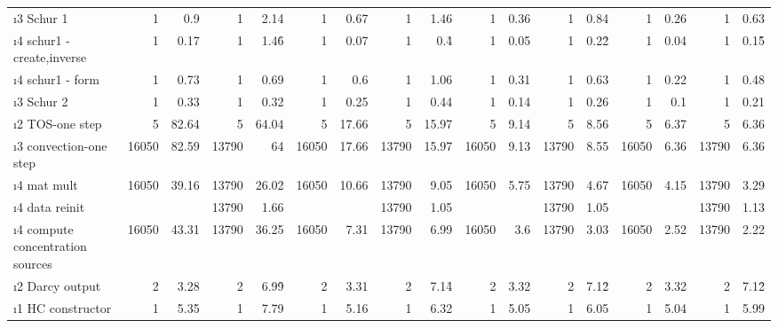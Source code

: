 \begin{sidewaystable}[!htbp]
\begin{tabular}{|l|r|r|r|r|r|r|r|r|r|r|r|r|r|r|r|r|}
\i{3}   Schur 1                           &   1   &   0.9 &   1   &   2.14    &   1   &   0.67    &   1   &   1.46    &   1   &   0.36    &   1   &   0.84    &   1   &   0.26    &   1   &   0.63    \\
\i{4}    schur1 - create,inverse         &   1   &   0.17    &   1   &   1.46\r  &   1   &   0.07    &   1   &   0.4\r&  1   &   0.05    &   1   &   0.22\r  &   1   &   0.04    &   1   &   0.15\r  \\
\i{4}    schur1 - form                   &   1   &   0.73    &   1   &   0.69    &   1   &   0.6 &   1   &   1.06    &   1   &   0.31    &   1   &   0.63    &   1   &   0.22    &   1   &   0.48    \\
\i{3}   Schur 2                            &   1   &   0.33    &   1   &   0.32    &   1   &   0.25    &   1   &   0.44    &   1   &   0.14    &   1   &   0.26    &   1   &   0.1 &   1   &   0.21    \\
\i{2}  TOS-one step                        &   5   &   82.64   &   5   &   64.04   &   5   &   17.66   &   5   &   15.97   &   5   &   9.14    &   5   &   8.56    &   5   &   6.37    &   5   &   6.36    \\
\i{3}   convection-one step               &   16050   &   82.59   &   13790   &   64  &   16050   &   17.66   &   13790   &   15.97   &   16050   &   9.13    &   13790   &   8.55    &   16050   &   6.36    &   13790   &   6.36    \\ 
\i{4}    mat mult                        &   16050   &   39.16   &   13790   &   26.02   &   16050   &   10.66   &   13790   &   9.05    &   16050   &   5.75    &   13790   &   4.67    &   16050   &   4.15    &   13790   &   3.29    \\
\i{4}    data reinit                     &           &           &   13790   &   1.66\s &           &           &   13790   &   1.05\s  &           &           &   13790   &   1.05\s  &           &           &   13790   &   1.13\s  \\
\i{4}    compute concentration sources   &   16050   &   43.31   &   13790   &   36.25   &   16050   &   7.31    &   13790   &   6.99    &   16050   &   3.6 &   13790   &   3.03    &   16050   &   2.52    &   13790   &   2.22    \\
\i{2}  Darcy output                         &   2   &   3.28    &   2   &   6.99\r  &   2   &   3.31    &   2   &   7.14\r  &   2   &   3.32    &   2   &   7.12\r  &   2   &   3.32    &   2   &   7.12\r  \\
\i{1} HC constructor                         &   1   &   5.35    &   1   &   7.79    &   1   &   5.16    &   1   &   6.32    &   1   &   5.05    &   1   &   6.05    &   1   &   5.04    &   1   &   5.99    \\

\end{tabular}
\end{sidewaystable}
